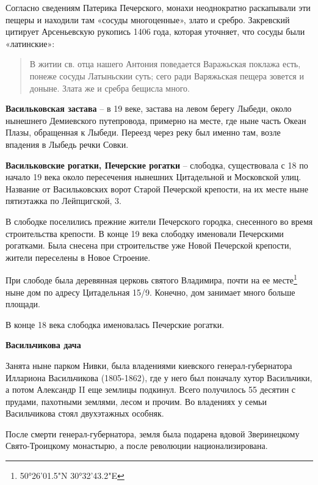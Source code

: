 Согласно сведениям Патерика Печерского, монахи неоднократно раскапывали эти пещеры и находили там «сосуды многоценные», злато и сребро. Закревский цитирует Арсеньевскую рукопись 1406 года, которая уточняет, что сосуды были «латинские»:

\begin{quotation}
В житии св. отца нашего Антония поведается Варажьская поклажа есть, понеже сосуды Латыньскии суть; сего ради Варяжьская пещера зовется и доныне. Злата же и сребра бещисла много.
\end{quotation}

\medskip

\textbf{Васильковская застава} – в 19 веке, застава на левом берегу Лыбеди, около нынешнего Демиевского путепровода, примерно на месте, где ныне часть Океан Плазы, обращенная к Лыбеди. Переезд через реку был именно там, возле впадения в Лыбедь речки Совки.\\

\medskip

\textbf{Васильковские рогатки, Печерские рогатки} – слободка, существовала с 18 по начало 19 века около пересечения нынешних Цитадельной и Московской улиц. Название от Васильковских ворот Старой Печерской крепости, на их месте ныне пятиэтажка по Лейпцигской, 3. 

В слободке поселились прежние жители Печерского городка, снесенного во время строительства крепости. В конце 19 века слободку именовали Печерскими рогатками. Была снесена при строительстве уже Новой Печерской крепости, жители переселены в Новое Строение.

При слободе была деревянная церковь святого Владимира, почти на ее месте\footnote{50°26'01.5"N 30°32'43.2"E} ныне дом по адресу Цитадельная 15/9. Конечно, дом занимает много больше площади.

В конце 18 века слободка именовалась Печерские рогатки.
\\

\medskip

\textbf{Васильчикова дача}

Занята ныне парком Нивки, была владениями киевского генерал-губернатора Иллариона Васильчикова (1805-1862), где у него был поначалу хутор Васильчики, а потом Александр II еще землицы подкинул. Всего получилось 55 десятин с прудами, пахотными землями, лесом и прочим. Во владениях у семьи Васильчикова стоял двухэтажных особняк.
 
После смерти генерал-губернатора, земля была подарена вдовой Зверинецкому Свято-Троицкому монастырю, а после революции национализирована. 


